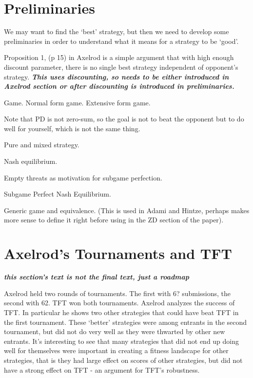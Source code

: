 \chapter{Preliminaries}

We may want to find the `best' strategy, but then we need to develop some preliminaries in order to understand what it means for a strategy to be `good'.

Proposition 1, (p 15) in Axelrod is a simple argument that with high enough discount parameter, there is no single best strategy independent of opponent's strategy. \textit{\textbf{This uses discounting, so needs to be either introduced in Axelrod section or after discounting is introduced in preliminaries.}}


\begin{definition}Game. Normal form game. Extensive form game.
\end{definition}

Note that PD is not zero-sum, so the goal is not to beat the opponent but to do well for yourself, which is not the same thing.

\begin{definition}Pure and mixed strategy.
\end{definition}

\begin{definition}Nash equilibrium.
\end{definition}

Empty threats as motivation for subgame perfection.

\begin{definition}Subgame Perfect Nash Equilibrium.
\end{definition}

\begin{definition}
Generic game and equivalence. (This is used in Adami and Hintze, perhaps makes more sense to define it right before using in the ZD section of the paper).
\end{definition}

\chapter{Axelrod's Tournaments and TFT}

\textit{\textbf{this section's text is not the final text, just a roadmap}}

Axelrod held two rounds of tournaments. The first with 6? submissions, the second with 62. TFT won both tournaments. Axelrod analyzes the success of TFT. In particular he shows two other strategies that could have beat TFT in the first tournament. These `better' strategies were among entrants in the second tournament, but did not do very well as they were thwarted by other new entrants. It's interesting to see that many strategies that did not end up doing well for themselves were important in creating a fitness landscape for other strategies, that is they had large effect on scores of other strategies, but did not have a strong effect on TFT - an argument for TFT's robustness.


